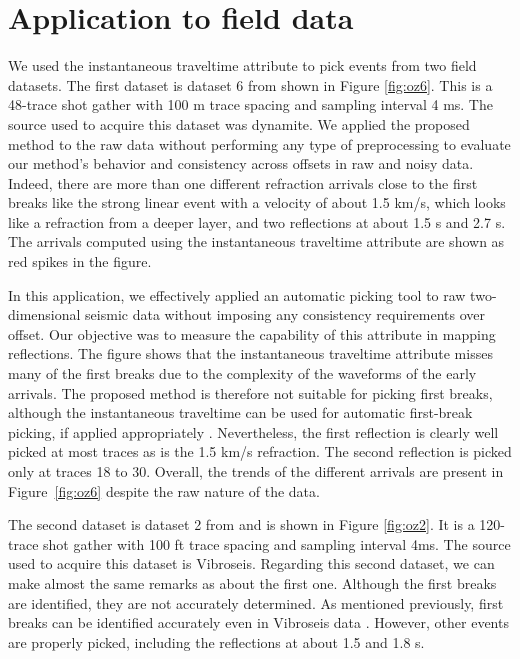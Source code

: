 \section{Application to field data}
We used the instantaneous traveltime attribute to pick events from two field datasets. 
The first dataset is dataset 6 from \cite{yilmaz} shown in Figure \ref{fig:oz6}. This is a 48-trace shot gather with 100 m trace spacing and sampling interval 4 ms. The source used to acquire this dataset was dynamite. We applied the proposed method to the raw data without performing any type of preprocessing to evaluate our method's behavior and consistency across offsets in raw and noisy data. Indeed, there are more than one different refraction arrivals close to the first breaks like the strong linear event with a velocity of about 1.5 km/s, which looks like a refraction from a deeper layer, and two reflections at about 1.5 s and 2.7 s. The arrivals computed using the instantaneous traveltime attribute are shown as red spikes in the figure.

In this application, we effectively applied an automatic picking tool to raw two-dimensional seismic data without imposing any consistency requirements over offset. Our objective was to measure the capability of this attribute in mapping reflections. 
The figure shows that the instantaneous traveltime attribute misses many of the first breaks due to the complexity of the waveforms of the early arrivals. The proposed method is therefore not suitable for picking first breaks, although the instantaneous traveltime can be used for automatic first-break picking, if applied appropriately \citep{saragiotis12itime1st}. Nevertheless, the first reflection is clearly well picked at most traces as is the 1.5 km/s refraction. 
The second reflection is picked only at traces 18 to 30.  
Overall, the trends of the different arrivals are present in Figure~\ref{fig:oz6} despite the raw nature of the data. 

The second dataset is dataset 2 from \cite{yilmaz} and is shown in Figure \ref{fig:oz2}. It is a 120-trace shot gather with 100 ft trace spacing and sampling interval 4ms. The source used to acquire this dataset is Vibroseis. Regarding this second dataset, we can make almost the same remarks as about the first one. Although the first breaks are identified, they are not accurately determined. As mentioned previously, first breaks can be identified accurately even in Vibroseis data \citep{saragiotis12itime1st}. However, other events are properly picked, including the reflections at about 1.5 and 1.8 s.

